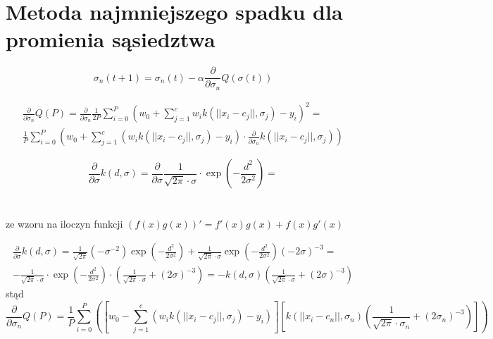 \documentclass[12pt,a4paper]{article}
\begin{document}
\section{Metoda najmniejszego spadku dla promienia sąsiedztwa}
\begin{equation}
\sigma_n(t+1)=\sigma_n(t)-\alpha \frac{\partial}{\partial \sigma_n}Q(\sigma(t))
\end{equation}

\begin{equation*}
\begin{aligned}
\frac{\partial}{\partial \sigma_n}Q(P)=
\frac{\partial}{\partial \sigma_n}\frac{1}{2P} \sum^P_{i=0}
	\left(w_0+\sum^c_{j=1}w_ik(||x_i-c_j||,\sigma_j )-y_i\right) ^2= \\
\frac{1}{P} \sum^P_{i=0} \left(w_0+\sum^c_{j=1} \left( w_ik(||x_i-c_j||,\sigma_j )-y_i \right)\cdot\frac{\partial}{\partial \sigma_n}k(||x_i-c_j||,\sigma_j ) \right)
\end{aligned}
\end{equation*}

$$
\frac{\partial}{\partial \sigma}k(d,\sigma)=\frac{\partial}{\partial \sigma}\frac{1}{\sqrt{2\pi}\cdot\sigma }\cdot \exp\left( -\frac{d^2}{2\sigma ^2}\right) =
$$
\\
\\
ze wzoru na iloczyn funkcji $(f(x)g(x))'=f'(x)g(x)+f(x)g'(x)$

\begin{equation*}
\begin{aligned}
\frac{\partial}{\partial \sigma}k(d,\sigma)=\frac{1}{\sqrt{2\pi}}\left(-\sigma^{-2}\right)\exp\left( -\frac{d^2}{2\sigma ^2}\right) + \frac{1}{\sqrt{2\pi}\cdot\sigma } \exp\left( -\frac{d^2}{2\sigma ^2}\right) (-2\sigma)^{-3}=\\
-\frac{1}{\sqrt{2\pi}\cdot\sigma }\cdot \exp\left( -\frac{d^2}{2\sigma ^2}\right)\cdot \left(\frac{1}{\sqrt{2\pi}\cdot\sigma} +(2\sigma)^{-3} \right)=
-k(d,\sigma)\left(\frac{1}{\sqrt{2\pi}\cdot\sigma} +(2\sigma)^{-3} \right)
\end{aligned}
\end{equation*}
stąd
$$
\frac{\partial}{\partial \sigma_n}Q(P)=\frac{1}{P} \sum^P_{i=0} \left(\left[ w_0-\sum^c_{j=1} \left( w_ik(||x_i-c_j||,\sigma_j )-y_i\right) \right]\left[ k(||x_i-c_n||,\sigma_n )\left(\frac{1}{\sqrt{2\pi}\cdot\sigma_n} +(2\sigma_n)^{-3} \right)\right] \right)
$$
\end{document}
